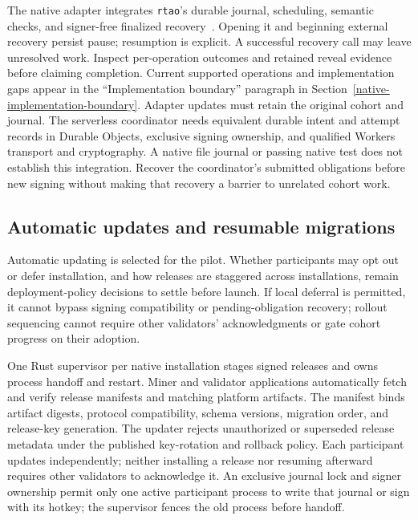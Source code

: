 The native adapter integrates \texttt{rtao}'s durable journal, scheduling,
semantic checks, and signer-free finalized recovery~\cite{rtao,nativeadapter}.
Opening it and beginning external recovery persist pause; resumption is explicit.
A successful recovery call may leave unresolved work. Inspect per-operation
outcomes and retained reveal evidence before claiming completion. Current
supported operations and implementation gaps appear in the ``Implementation
boundary'' paragraph in Section~\ref{native-implementation-boundary}.
Adapter updates must retain the original cohort and journal.
The serverless coordinator needs equivalent durable intent and attempt records
in Durable Objects, exclusive signing ownership, and qualified Workers transport
and cryptography. A native file journal or passing native test does not establish
this integration. Recover the coordinator's submitted obligations before new
signing without making that recovery a barrier to unrelated cohort work.

\subsection{Automatic updates and resumable migrations}\label{participant-updates}

Automatic updating is selected for the pilot. Whether participants may opt out
or defer installation, and how releases are staggered across installations,
remain deployment-policy decisions to settle before launch. If local deferral
is permitted, it cannot bypass signing compatibility or pending-obligation
recovery; rollout sequencing cannot require other validators' acknowledgments
or gate cohort progress on their adoption.

One Rust supervisor per native installation stages signed releases and owns
process handoff and restart. Miner and validator applications automatically
fetch and verify release manifests and matching platform artifacts. The manifest
binds artifact digests, protocol compatibility, schema versions, migration
order, and release-key generation. The updater rejects unauthorized or
superseded release metadata under the published key-rotation and rollback
policy. Each participant updates independently; neither installing a release
nor resuming afterward requires other validators to acknowledge it. An exclusive
journal lock and signer ownership permit only one active participant process to
write that journal or sign with its hotkey; the supervisor fences the old
process before handoff.

